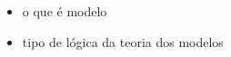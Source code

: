 \cite{modeltheory}
\begin{itemize}
    \item o que é modelo 
    \item tipo de lógica da teoria dos modelos
\end{itemize}